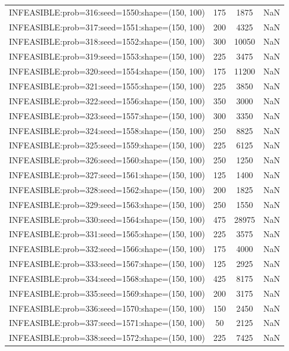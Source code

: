\begin{longtable}{lccc}
INFEASIBLE:prob=316:seed=1550:shape=(150, 100) &      175 &  1875 &    NaN \\
INFEASIBLE:prob=317:seed=1551:shape=(150, 100) &      200 &  4325 &    NaN \\
INFEASIBLE:prob=318:seed=1552:shape=(150, 100) &      300 & 10050 &    NaN \\
INFEASIBLE:prob=319:seed=1553:shape=(150, 100) &      225 &  3475 &    NaN \\
INFEASIBLE:prob=320:seed=1554:shape=(150, 100) &      175 & 11200 &    NaN \\
INFEASIBLE:prob=321:seed=1555:shape=(150, 100) &      225 &  3850 &    NaN \\
INFEASIBLE:prob=322:seed=1556:shape=(150, 100) &      350 &  3000 &    NaN \\
INFEASIBLE:prob=323:seed=1557:shape=(150, 100) &      300 &  3350 &    NaN \\
INFEASIBLE:prob=324:seed=1558:shape=(150, 100) &      250 &  8825 &    NaN \\
INFEASIBLE:prob=325:seed=1559:shape=(150, 100) &      225 &  6125 &    NaN \\
INFEASIBLE:prob=326:seed=1560:shape=(150, 100) &      250 &  1250 &    NaN \\
INFEASIBLE:prob=327:seed=1561:shape=(150, 100) &      125 &  1400 &    NaN \\
INFEASIBLE:prob=328:seed=1562:shape=(150, 100) &      200 &  1825 &    NaN \\
INFEASIBLE:prob=329:seed=1563:shape=(150, 100) &      250 &  1550 &    NaN \\
INFEASIBLE:prob=330:seed=1564:shape=(150, 100) &      475 & 28975 &    NaN \\
INFEASIBLE:prob=331:seed=1565:shape=(150, 100) &      225 &  3575 &    NaN \\
INFEASIBLE:prob=332:seed=1566:shape=(150, 100) &      175 &  4000 &    NaN \\
INFEASIBLE:prob=333:seed=1567:shape=(150, 100) &      125 &  2925 &    NaN \\
INFEASIBLE:prob=334:seed=1568:shape=(150, 100) &      425 &  8175 &    NaN \\
INFEASIBLE:prob=335:seed=1569:shape=(150, 100) &      200 &  3175 &    NaN \\
INFEASIBLE:prob=336:seed=1570:shape=(150, 100) &      150 &  2450 &    NaN \\
INFEASIBLE:prob=337:seed=1571:shape=(150, 100) &       50 &  2125 &    NaN \\
INFEASIBLE:prob=338:seed=1572:shape=(150, 100) &      225 &  7425 &    NaN \\

\end{longtable}
